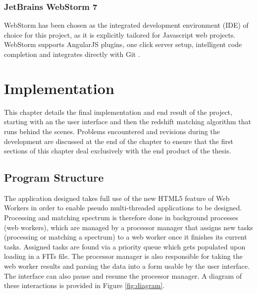 \documentclass[titlesmallcaps, examinerscopy, copyrightpage]{uqthesis}
\begin{document}
\subsection{JetBrains WebStorm 7}

WebStorm has been chosen as the integrated development environment (IDE) of choice for this project, as it is explicitly tailored for Javascript web projects. WebStorm supports AngularJS plugins, one click server setup, intelligent code completion and integrates directly with Git \cite{WebStorm}.








































\chapter{Implementation}
\label{ch:impl}

This chapter details the final implementation and end result of the project, starting with an the user interface and then the redshift matching algorithm that runs behind the scenes. Problems encountered and revisions during the development are discussed at the end of the chapter to ensure that the first sections of this chapter deal exclusively with the end product of the thesis.


\section{Program Structure}

The application designed takes full use of the new HTML5 feature of Web Workers in order to enable pseudo multi-threaded applications to be designed. Processing and matching spectrum is therefore done in background processes (web workers), which are managed by a processor manager that assigns new tasks (processing or matching a spectrum) to a web worker once it finishes its current tasks. Assigned tasks are found via a priority queue which gets populated upon loading in a FITs file. The processor manager is also responsible for taking the web worker results and parsing the data into a form usable by the user interface. The interface can also pause and resume the processor manager. A diagram of these interactions is provided in Figure \ref{fig:diagram}.
\end{document}
